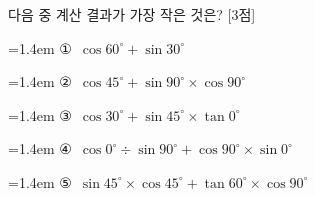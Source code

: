 다음 중 계산 결과가 가장 작은 것은? \mbox{[3점]}
\par\medskip\par\noindent\hangindent=1.4em {\small ①}\ $\cos 60^\circ+\sin 30^\circ$\par\noindent\hangindent=1.4em {\small ②}\ $\cos 45^\circ+\sin 90^\circ\times\cos 90^\circ$\par\noindent\hangindent=1.4em {\small ③}\ $\cos 30^\circ+\sin 45^\circ\times\tan 0^\circ$\par\noindent\hangindent=1.4em {\small ④}\ $\cos 0^\circ\div\sin 90^\circ+\cos 90^\circ\times\sin 0^\circ$\par\noindent\hangindent=1.4em {\small ⑤}\ $\sin 45^\circ\times\cos 45^\circ+\tan 60^\circ\times\cos 90^\circ$\par\medskip
